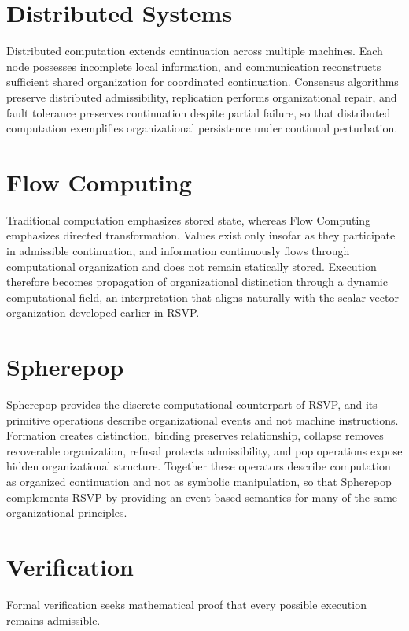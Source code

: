 \documentclass[11pt,oneside]{book}
\numberwithin{equation}{chapter}
\theoremstyle{definition}
\theoremstyle{plain}
\begin{document}
\section{Distributed Systems}

Distributed computation extends continuation across multiple machines. Each node possesses incomplete local information, and communication reconstructs sufficient shared organization for coordinated continuation. Consensus algorithms preserve distributed admissibility, replication performs organizational repair, and fault tolerance preserves continuation despite partial failure, so that distributed computation exemplifies organizational persistence under continual perturbation.

\section{Flow Computing}

Traditional computation emphasizes stored state, whereas Flow Computing emphasizes directed transformation. Values exist only insofar as they participate in admissible continuation, and information continuously flows through computational organization and does not remain statically stored. Execution therefore becomes propagation of organizational distinction through a dynamic computational field, an interpretation that aligns naturally with the scalar-vector organization developed earlier in RSVP.

\section{Spherepop}

Spherepop provides the discrete computational counterpart of RSVP, and its primitive operations describe organizational events and not machine instructions. Formation creates distinction, binding preserves relationship, collapse removes recoverable organization, refusal protects admissibility, and pop operations expose hidden organizational structure. Together these operators describe computation as organized continuation and not as symbolic manipulation, so that Spherepop complements RSVP by providing an event-based semantics for many of the same organizational principles.

\section{Verification}

Formal verification seeks mathematical proof that every possible execution
remains admissible.
\end{document}
